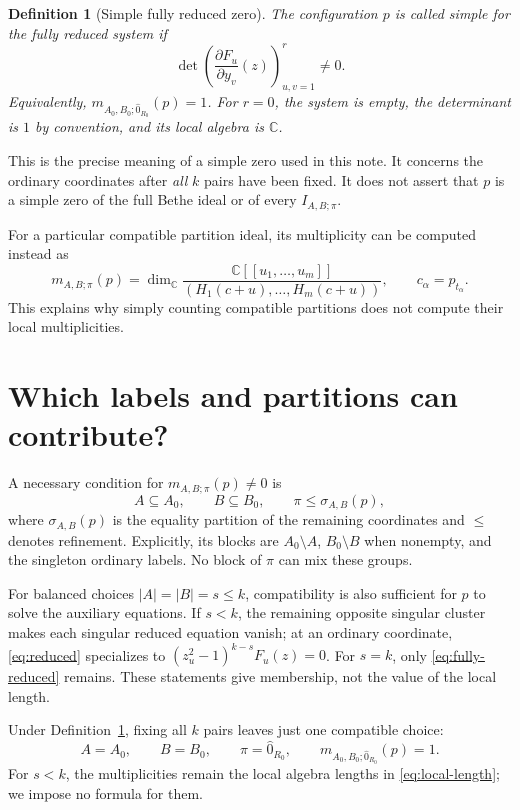 \documentclass[11pt]{article}
\newtheorem{definition}{Definition}[section]
\newcommand{\C}{\mathbb C}
\begin{document}
\begin{definition}[Simple fully reduced zero]\label{def:simple}
The configuration $p$ is called simple for the fully reduced system if
\[
 \det\left(\frac{\partial F_u}{\partial y_v}(z)\right)_{u,v=1}^r
 \ne0.
\]
Equivalently,
$m_{A_0,B_0;\hat0_{R_0}}(p)=1$.
For $r=0$, the system is empty, the determinant is $1$ by convention,
and its local algebra is $\C$.
\end{definition}

This is the precise meaning of a simple zero used in this note.
It concerns the ordinary coordinates after \emph{all} $k$ pairs have
been fixed. It does not assert that $p$ is a simple zero of the full
Bethe ideal or of every $I_{A,B;\pi}$.

For a particular compatible partition ideal, its multiplicity can be
computed instead as
\[
 m_{A,B;\pi}(p)
 =
 \dim_\C
 \frac{\C[[u_1,\ldots,u_m]]}
 {(H_1(c+u),\ldots,H_m(c+u))},
 \qquad c_\alpha=p_{t_\alpha}.
\]
This explains why simply counting compatible partitions
does not compute their local multiplicities.

\section{Which labels and partitions can contribute?}

A necessary condition for $m_{A,B;\pi}(p)\ne0$ is
\begin{equation}\label{eq:compatible}
 A\subseteq A_0,\qquad B\subseteq B_0,\qquad
 \pi\leq \sigma_{A,B}(p),
\end{equation}
where $\sigma_{A,B}(p)$ is the equality partition of the remaining
coordinates and $\leq$ denotes refinement.
Explicitly, its blocks are $A_0\setminus A$, $B_0\setminus B$
when nonempty, and the singleton ordinary labels.
No block of $\pi$ can mix these groups.

For balanced choices $|A|=|B|=s\leq k$, compatibility is also
sufficient for $p$ to solve the auxiliary equations.
If $s<k$, the remaining opposite singular cluster makes each
singular reduced equation vanish; at an ordinary coordinate,
\eqref{eq:reduced} specializes to
$(z_u^2-1)^{k-s}F_u(z)=0$.
For $s=k$, only \eqref{eq:fully-reduced} remains.
These statements give membership, not the value of the local length.

Under Definition~\ref{def:simple}, fixing all $k$ pairs leaves just
one compatible choice:
\[
 A=A_0,\qquad B=B_0,\qquad \pi=\hat0_{R_0},
 \qquad m_{A_0,B_0;\hat0_{R_0}}(p)=1.
\]
For $s<k$, the multiplicities remain the local algebra lengths
in \eqref{eq:local-length}; we impose no formula for them.
\end{document}
